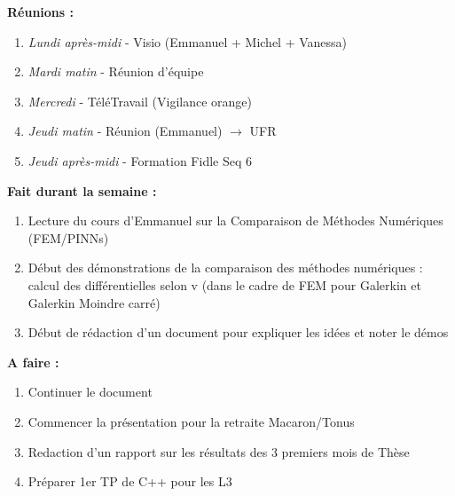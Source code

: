 \textbf{Réunions :}
\begin{enumerate}[label=\textbullet]
	\item \textit{Lundi après-midi} - Visio (Emmanuel + Michel + Vanessa)
	\item \textit{Mardi matin} - Réunion d'équipe
	\item \textit{Mercredi} - TéléTravail (Vigilance orange)
	\item \textit{Jeudi matin} - Réunion (Emmanuel) $\rightarrow$ UFR
	\item \textit{Jeudi après-midi} - Formation Fidle Seq 6
\end{enumerate}
\textbf{Fait durant la semaine :}
\begin{enumerate}[label=\textbullet]
	\item Lecture du cours d'Emmanuel sur la Comparaison de Méthodes Numériques (FEM/PINNs)
	\item Début des démonstrations de la comparaison des méthodes numériques : calcul des différentielles selon v (dans le cadre de FEM pour Galerkin et Galerkin Moindre carré)
	\item Début de rédaction d'un document pour expliquer les idées et noter le démos
\end{enumerate}
\textbf{A faire :}
\begin{enumerate}[label=\textbullet]
	\item Continuer le document
	\item Commencer la présentation pour la retraite Macaron/Tonus
	\item Redaction d'un rapport sur les résultats des 3 premiers mois de Thèse
	\item Préparer 1er TP de C++ pour les L3
\end{enumerate}